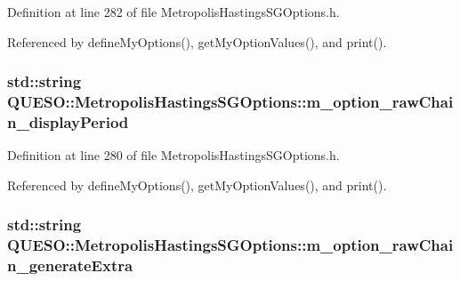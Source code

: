 Definition at line 282 of file Metropolis\-Hastings\-S\-G\-Options.\-h.



Referenced by define\-My\-Options(), get\-My\-Option\-Values(), and print().

\hypertarget{class_q_u_e_s_o_1_1_metropolis_hastings_s_g_options_aa898db5d9a9541c71b727817f1fb443f}{
\subsubsection[{m\-\_\-option\-\_\-raw\-Chain\-\_\-display\-Period}]{\setlength{\rightskip}{0pt plus 5cm}std\-::string Q\-U\-E\-S\-O\-::\-Metropolis\-Hastings\-S\-G\-Options\-::m\-\_\-option\-\_\-raw\-Chain\-\_\-display\-Period\hspace{0.3cm}{\ttfamily [private]}}}\label{class_q_u_e_s_o_1_1_metropolis_hastings_s_g_options_aa898db5d9a9541c71b727817f1fb443f}


Definition at line 280 of file Metropolis\-Hastings\-S\-G\-Options.\-h.



Referenced by define\-My\-Options(), get\-My\-Option\-Values(), and print().

\hypertarget{class_q_u_e_s_o_1_1_metropolis_hastings_s_g_options_a9f4213c0fc6f0cf26eb103c78defc0ae}{
\subsubsection[{m\-\_\-option\-\_\-raw\-Chain\-\_\-generate\-Extra}]{\setlength{\rightskip}{0pt plus 5cm}std\-::string Q\-U\-E\-S\-O\-::\-Metropolis\-Hastings\-S\-G\-Options\-::m\-\_\-option\-\_\-raw\-Chain\-\_\-generate\-Extra\hspace{0.3cm}{\ttfamily [private]}}}\label{class_q_u_e_s_o_1_1_metropolis_hastings_s_g_options_a9f4213c0fc6f0cf26eb103c78defc0ae}


